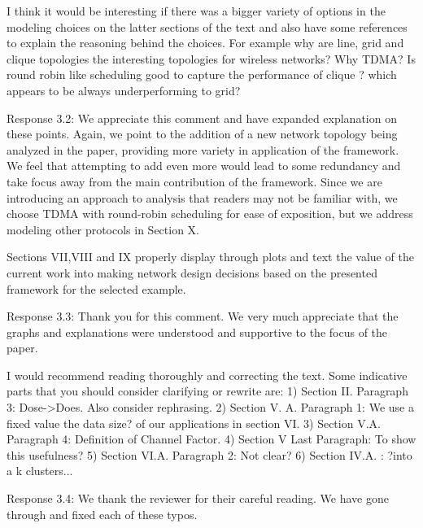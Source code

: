 \documentclass[12pt, letterpaper, onecolumn]{IEEEtran}
\begin{document}
I think it would be interesting if there was a bigger variety of options in the modeling choices on the latter sections of the text and also have some references to explain the reasoning behind the choices. For example why are line, grid and clique topologies the interesting topologies for wireless networks? Why TDMA? Is round robin like scheduling good to capture the performance of clique ? which appears to be always underperforming to grid?

{\color{blue}
Response 3.2: We appreciate this comment and have expanded explanation on these points. Again, we point to the addition of a new network topology being analyzed in the paper, providing more variety in application of the framework. We feel that attempting to add even more would lead to some redundancy and take focus away from the main contribution of the framework. Since we are introducing an approach to analysis that readers may not be familiar with, we choose TDMA with round-robin scheduling for ease of exposition, but we address modeling other protocols in Section X. 
}

Sections VII,VIII and IX properly display through plots and text the value of the current work into making network design decisions based on the presented framework for the selected example.

{\color{blue}
Response 3.3: Thank you for this comment. We very much appreciate that the graphs and explanations were understood and supportive to the focus of the paper. 
}

I would recommend reading thoroughly and correcting the text. Some indicative parts that you should consider clarifying or rewrite are:
1) Section II. Paragraph 3: Dose->Does. Also consider rephrasing.
2) Section V. A. Paragraph 1: We use a fixed value the data size? of our applications in section VI.
3) Section V.A. Paragraph 4: Definition of Channel Factor.
4) Section V Last Paragraph: To show this usefulness?
5) Section VI.A. Paragraph 2: Not clear?
6) Section IV.A. : ?into a k clusters...

{\color{blue}
Response 3.4: We thank the reviewer for their careful reading. We have gone through and fixed each of these typos. 
}



\end{document}
